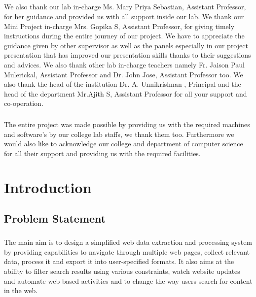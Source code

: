 \documentclass[a4paper]{report}
\begin{document}
\paragraph{}
\large\textnormal{ We also thank our lab in-charge Ms. Mary Priya Sebastian, Assistant Professor, for her guidance and provided us with all support inside our lab. We thank our Mini Project in-charge Mrs. Gopika S, Assistant Professor, for giving timely instructions during the entire journey of our project. We have to appreciate the guidance given by other supervisor as well as the panels especially in our project presentation that has improved our presentation skills thanks to their suggestions and advices. We also thank other lab in-charge teachers namely Fr. Jaison Paul Mulerickal, Assistant Professor and Dr. John Jose, Assistant Professor too. We also thank the head of the institution Dr. A. Unnikrishnan , Principal and the head of the department Mr.Ajith S, Assistant Professor for all your support and co-operation.}

\paragraph{}
\large\textnormal{The entire project was made possible by providing us with the required machines and software’s by our college lab staffs, we thank them too. Furthermore we would also like to acknowledge our college and department of computer science for all their support and providing us with the required facilities.}
\tableofcontents

\newpage
{}
\setcounter{page}{1}

\chapter{Introduction}
\section{Problem Statement}
\paragraph{}
\large\textnormal{The main aim is to design a simplified web data extraction and processing system by providing capabilities to navigate through multiple web pages, collect relevant data, process it and export it into user-specified formats. It also aims at the ability to filter search results using various constraints, watch website updates and automate web based activities and to change the way users search for content in the web. }
\end{document}
